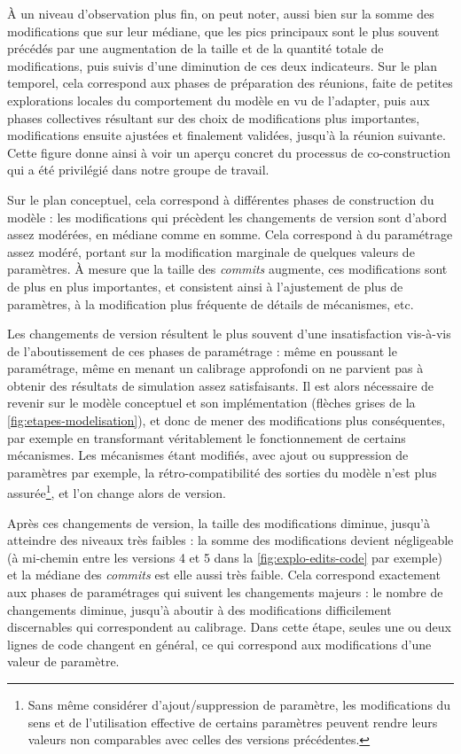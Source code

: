 À un niveau d'observation plus fin, on peut noter, aussi bien sur la somme des modifications que sur leur médiane, que les pics principaux sont le plus souvent précédés par une augmentation de la taille et de la quantité totale de modifications, puis suivis d'une diminution de ces deux indicateurs.
Sur le plan \og temporel\fg{}, cela correspond aux phases de préparation des réunions, faite de petites explorations locales du comportement du modèle en vu de l'adapter, puis aux phases collectives résultant sur des choix de modifications plus importantes, modifications ensuite ajustées et finalement validées, jusqu'à la réunion suivante.
Cette figure donne ainsi à voir un aperçu concret du processus de co-construction qui a été privilégié dans notre groupe de travail.

Sur le plan conceptuel, cela correspond à différentes phases de construction du modèle : les modifications qui précèdent les changements de version sont d'abord assez modérées, en médiane comme en somme.
Cela correspond à du paramétrage assez modéré, portant sur la modification marginale de quelques valeurs de paramètres.
À mesure que la taille des \textit{commits} augmente, ces modifications sont de plus en plus importantes, et consistent ainsi à l'ajustement de plus de paramètres, à la modification plus fréquente de détails de mécanismes, etc.

Les changements de version résultent le plus souvent d'une insatisfaction vis-à-vis de l'aboutissement de ces phases de paramétrage : même en poussant le paramétrage, même en menant un calibrage approfondi on ne parvient pas à obtenir des résultats de simulation assez satisfaisants.
Il est alors nécessaire de revenir sur le modèle conceptuel et son implémentation (flèches grises de la \cref{fig:etapes-modelisation}), et donc de mener des modifications plus conséquentes, par exemple en transformant véritablement le fonctionnement de certains mécanismes.
Les mécanismes étant modifiés, avec ajout ou suppression de paramètres par exemple, la rétro-compatibilité des sorties du modèle n'est plus assurée\footnote{
	Sans même considérer d'ajout/suppression de paramètre, les modifications du sens et de l'utilisation effective de certains paramètres peuvent rendre leurs valeurs non comparables avec celles des versions précédentes.
}, et l'on change alors de version.

Après ces changements de version, la taille des modifications diminue, jusqu'à atteindre des niveaux très faibles : la somme des modifications devient négligeable (à mi-chemin entre les versions 4 et 5 dans la \cref{fig:explo-edits-code} par exemple) et la médiane des \textit{commits} est elle aussi très faible.
Cela correspond exactement aux phases de paramétrages qui suivent les changements majeurs : le nombre de changements diminue, jusqu'à aboutir à des modifications difficilement discernables qui correspondent au calibrage.
Dans cette étape, seules une ou deux lignes de code changent en général, ce qui correspond aux modifications d'une valeur de paramètre.

